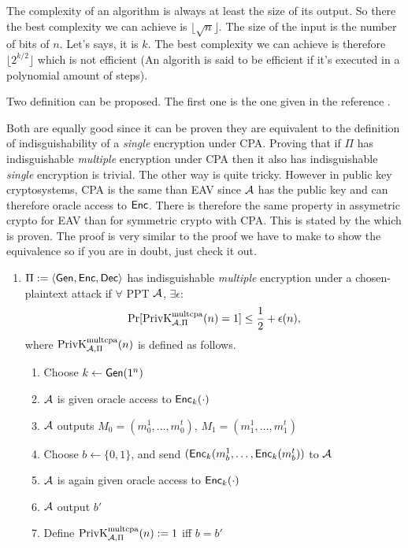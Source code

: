 \begin{solution}
  The complexity of an algorithm is always at least
  the size of its output.
  So there the best complexity we can achieve is $\lfloor\sqrt{n}\rfloor$.
  The size of the input is the number of bits of $n$.
  Let's says, it is $k$.
  The best complexity we can achieve is therefore
  $\lfloor2^{k/2}\rfloor$ which is not efficient (An algorith is said to be efficient if it's executed in a polynomial amount of steps).
\end{solution}

\begin{solution}
  Two definition can be proposed.
  The first one is the one given in the reference \cite[p.~84]{katz2007introduction}.

  Both are equally good since it can be proven they are equivalent to the definition of indisguishability of a \emph{single} encryption
  under CPA.
  Proving that if $\Pi$ has indisguishable \emph{multiple} encryption under CPA then it also has indisguishable \emph{single} encryption
  is trivial.
  The other way is quite tricky.
  However in public key cryptosystems, CPA is the same than EAV since $\mathcal{A}$ has the public key and can therefore oracle access to $\operatorname{\mathsf{Enc}}$.
  There is therefore the same property in assymetric crypto for EAV than for symmetric crypto with CPA.
  This is stated by the \cite[theorem~10.10]{katz2007introduction} which is proven.
  The proof is very similar to the proof we have to make to show the equivalence so if you are in doubt, just check it out.

  \begin{enumerate}

    \item
      $\Pi := \langle\operatorname{\mathsf{Gen}}, \operatorname{\mathsf{Enc}}, \operatorname{\mathsf{Dec}}\rangle$ has indisguishable \emph{multiple} encryption under a chosen-plaintext attack
      if $\forall$ PPT $\mathcal{A}$, $\exists \epsilon$:
      \[ \Pr[\operatorname{PrivK}^{\text{multcpa}}_{\mathcal{A},\Pi}(n) = 1] \leq \frac{1}{2} + \epsilon(n), \]
      where $\operatorname{PrivK}^{\text{multcpa}}_{\mathcal{A},\Pi}(n)$ is defined as follows.
      \begin{enumerate}
        \item Choose $k \leftarrow \operatorname{\mathsf{Gen}}(1^n)$
        \item $\mathcal{A}$ is given oracle access to $\operatorname{\mathsf{Enc}}_k(\cdot)$
        \item $\mathcal{A}$ outputs $M_0 = (m_0^1, \ldots, m_0^t)$, $M_1 = (m_1^1, \ldots, m_1^t)$
        \item Choose $b \leftarrow \{0,1\}$, and send $(\operatorname{\mathsf{Enc}}_k(m_b^1, \ldots, \operatorname{\mathsf{Enc}}_k(m_b^t))$ to $\mathcal{A}$
        \item $\mathcal{A}$ is again given oracle access to $\operatorname{\mathsf{Enc}}_k(\cdot)$
        \item $\mathcal{A}$ output $b'$
        \item Define $\operatorname{PrivK}^{\text{multcpa}}_{\mathcal{A},\Pi}(n) := 1$ iff $b = b'$
      \end{enumerate}
	


\end{enumerate}
\end{solution}
